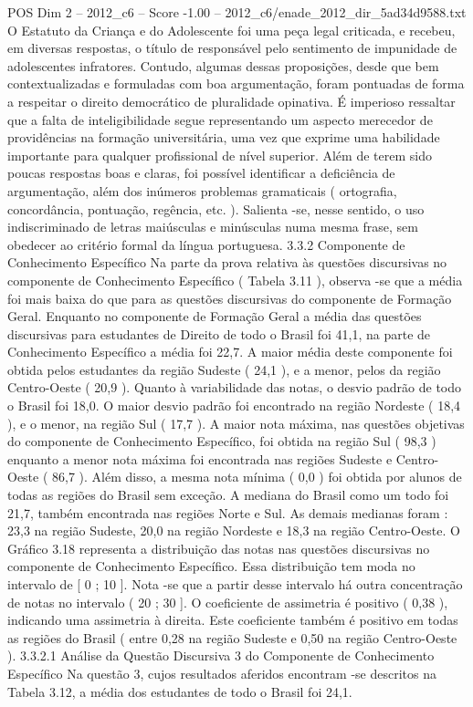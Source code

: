 \begin{textsample}{POS Dim 2 – 2012\_c6 – Score -1.00 – 2012\_c6/enade\_2012\_dir\_5ad34d9588.txt}
O Estatuto da Criança e do Adolescente foi uma peça legal criticada, e recebeu, em diversas respostas, o título de responsável pelo sentimento de impunidade de adolescentes infratores.
Contudo, algumas dessas proposições, desde que bem contextualizadas e formuladas com boa argumentação, foram pontuadas de forma a respeitar o direito democrático de pluralidade opinativa.
É imperioso ressaltar que a falta de inteligibilidade segue representando um aspecto merecedor de providências na formação universitária, uma vez que exprime uma habilidade importante para qualquer profissional de nível superior.
Além de terem sido poucas respostas boas e claras, foi possível identificar a deficiência de argumentação, além dos inúmeros problemas gramaticais ( ortografia, concordância, pontuação, regência, etc. ).
Salienta -se, nesse sentido, o uso indiscriminado de letras maiúsculas e minúsculas numa mesma frase, sem obedecer ao critério formal da língua portuguesa. 3.3.2 Componente de Conhecimento Específico Na parte da prova relativa às questões discursivas no componente de Conhecimento Específico ( Tabela 3.11 ), observa -se que a média foi mais baixa do que para as questões discursivas do componente de Formação Geral.
Enquanto no componente de Formação Geral a média das questões discursivas para estudantes de Direito de todo o Brasil foi 41,1, na parte de Conhecimento Específico a média foi 22,7.
A maior média deste componente foi obtida pelos estudantes da região Sudeste ( 24,1 ), e a menor, pelos da região Centro-Oeste ( 20,9 ).
Quanto à variabilidade das notas, o desvio padrão de todo o Brasil foi 18,0.
O maior desvio padrão foi encontrado na região Nordeste ( 18,4 ), e o menor, na região Sul ( 17,7 ).
A maior nota máxima, nas questões objetivas do componente de Conhecimento Específico, foi obtida na região Sul ( 98,3 ) enquanto a menor nota máxima foi encontrada nas regiões Sudeste e Centro-Oeste ( 86,7 ).
Além disso, a mesma nota mínima ( 0,0 ) foi obtida por alunos de todas as regiões do Brasil sem exceção.
A mediana do Brasil como um todo foi 21,7, também encontrada nas regiões Norte e Sul.
As demais medianas foram : 23,3 na região Sudeste, 20,0 na região Nordeste e 18,3 na região Centro-Oeste.
O Gráfico 3.18 representa a distribuição das notas nas questões discursivas no componente de Conhecimento Específico.
Essa distribuição tem moda no intervalo de [ 0 ; 10 ].
Nota -se que a partir desse intervalo há outra concentração de notas no intervalo ( 20 ; 30 ].
O coeficiente de assimetria é positivo ( 0,38 ), indicando uma assimetria à direita.
Este coeficiente também é positivo em todas as regiões do Brasil ( entre 0,28 na região Sudeste e 0,50 na região Centro-Oeste ). 3.3.2.1 Análise da Questão Discursiva 3 do Componente de Conhecimento Específico Na questão 3, cujos resultados aferidos encontram -se descritos na Tabela 3.12, a média dos estudantes de todo o Brasil foi 24,1.

\end{textsample}
